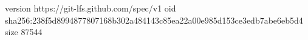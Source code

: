 version https://git-lfs.github.com/spec/v1
oid sha256:238f5d8994877807168b302a484143c85ea22a00e985d153ce3edb7abe6eb5d4
size 87544
